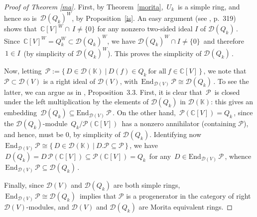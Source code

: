 \documentclass{amsart}
\theoremstyle{definition}
\theoremstyle{remark}
\numberwithin{equation}{section}
\begin{document}
\begin{proof}[Proof of Theorem \ref{ma}]
First, by Theorem~\ref{morita}, $\, U_k \,$ is a
simple ring, and hence so is $\, {\mathcal{D}}(Q_k)^W $, by
Proposition~\ref{is}. An easy argument (see \cite{BEG}, p.~319)
shows that $\, {\mathbb{C}}[V]^W \cap\, I \not= \{0\} $ for any nonzero
two-sided ideal $ I $ of $ {\mathcal{D}}(Q_k) \,$. Since $\, {\mathbb{C}}[V]^W =
Q_k^W \subset {\mathcal{D}}(Q_k)^W $, we have $ {\mathcal{D}}(Q_k)^W \cap I \not=
\{0\}\,$ and therefore $\, 1 \in I \,$ (by simplicity of $ {\mathcal{D}}(Q_k)^W$).
This proves the simplicity of $ {\mathcal{D}}(Q_k)\,$.

Now, letting $\,{\mathcal{P}} := \{\,D \in {\mathcal{D}}({\mathbb{K}})\ |\ D(f) \in Q_k \
\text{for all} \ f \in {\mathbb{C}}[V]\,\}\,$, we note that $ {\mathcal{P}} \subset
{\mathcal{D}}(V) $ is a right ideal of $ {\mathcal{D}}(V) $, with $\, {\mathrm{End}}_{{\mathcal{D}}(V)}\,{\mathcal{P}}
\cong {\mathcal{D}}(Q_k)\,$. To see the latter, we can argue as in \cite{SS},
Proposition~3.3. First, it is clear that $\,{\mathcal{P}}\,$ is closed under
the left multiplication by the elements of $ {\mathcal{D}}(Q_k) $ in $ {\mathcal{D}}({\mathbb{K}})
$: this gives an embedding $\,{\mathcal{D}}(Q_k) \subseteq {\mathrm{End}}_{{\mathcal{D}}(V)}\,{\mathcal{P}}
\,$. On the other hand, $\,{\mathcal{P}}({\mathbb{C}}[V]) = Q_k \,$, since the $
{\mathcal{D}}(Q_k) $-module $\, Q_k/{\mathcal{P}}({\mathbb{C}}[V])\,$ has a nonzero annihilator
(containing $ {\mathcal{P}} $), and hence, must be $ 0 $, by simplicity of $
{\mathcal{D}}(Q_k)$. Identifying now $\, {\mathrm{End}}_{{\mathcal{D}}(V)}\,{\mathcal{P}} \cong \{\,D \in
{\mathcal{D}}({\mathbb{K}})\ |\ D.{\mathcal{P}} \subseteq {\mathcal{P}}\,\}\,$, we have $\, D(Q_k) =
D\,{\mathcal{P}}({\mathbb{C}}[V]) \subseteq {\mathcal{P}}({\mathbb{C}}[V]) = Q_k\,$ for any $\, D \in
{\mathrm{End}}_{{\mathcal{D}}(V)}\,{\mathcal{P}} \,$, whence $\, {\mathrm{End}}_{{\mathcal{D}}(V)}\,{\mathcal{P}} \subseteq
{\mathcal{D}}(Q_k)\,$.

Finally, since $ {\mathcal{D}}(V) $ and $ {\mathcal{D}}(Q_k) $ are both simple rings,
$\, {\mathrm{End}}_{{\mathcal{D}}(V)}\,{\mathcal{P}} \cong {\mathcal{D}}(Q_k)\,$ implies that $ {\mathcal{P}} $ is a
progenerator in the category of right $ {\mathcal{D}}(V)$-modules, and $
{\mathcal{D}}(V) $ and $ {\mathcal{D}}(Q_k) $ are Morita equivalent rings.
\end{proof}
\end{document}
